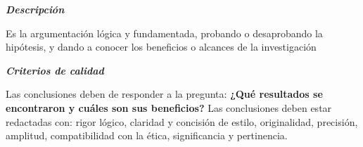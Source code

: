     \textbf{\textit{Descripción}}
    
    Es la argumentación lógica y fundamentada, probando o desaprobando la hipótesis, y dando a conocer los beneficios o alcances de la investigación
    
    \textbf{\textit{Criterios de calidad}}
    
    Las conclusiones deben de responder a la pregunta: \textbf{¿Qué resultados se encontraron y cuáles son sus beneficios?}
    Las conclusiones deben estar redactadas con: rigor lógico, claridad y concisión de estilo, originalidad, precisión, amplitud, compatibilidad con la ética, significancia y pertinencia.